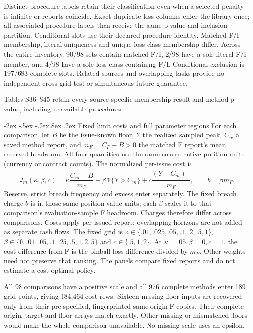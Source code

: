 \documentclass[10pt,a4paper]{article}
\makeatletter
\renewcommand\section{\@startsection{section}{1}{\z@}%
  {-2ex \@plus -.5ex \@minus -.2ex}{.8ex \@plus .2ex}%
  {\normalfont\large\bfseries}}
\makeatother
\begin{document}
Distinct procedure labels retain their classification even when a selected penalty is infinite or reports coincide. Exact duplicate loss columns enter the library once; all associated procedure labels then receive the same p-value and inclusion partition. Conditional slots use their declared procedure identity. Matched F/I membership, literal uniqueness and unique-loss-class membership differ. Across the entire inventory, 90/98 sets contain matched F/I, 2/98 have a sole literal F/I member, and 4/98 have a sole loss class containing F/I. Conditional exclusion is 197/683 complete slots. Related sources and overlapping tasks provide no independent cross-grid test or simultaneous future guarantee.

Tables S36--S45 retain every source-specific membership result and method p-value, including unavailable procedures.


\section{Fixed limit costs and full parameter regions}\label{sup:v10-cost}
For each comparison, let $B$ be the issue-known floor, $Y$ the realized sampled peak,
$C_m$ a saved method report, and $m_F=\overline{C_F-B}>0$ the matched F report's
mean reserved headroom. All four quantities use the same source-native position
units (currency or contract counts). The normalized per-issue cost is
\[
J_m(\kappa,\beta,c)=\kappa\frac{\overline{C_m-B}}{m_F}
+\beta\,\overline{\mathbf 1\{Y>C_m\}}
+c\frac{\overline{(Y-C_m)_+}}{m_F},\qquad b=\beta m_F.
\]
Reserve, strict breach frequency and excess enter separately. The fixed breach
charge $b$ is in those same position-value units; each $\beta$ scales it to that
comparison's evaluation-sample F headroom. Charges therefore differ across
comparisons. Costs apply per issued report; overlapping horizons are not
added as separate cash flows.
The fixed grid is $\kappa\in\{.01,.025,.05,.1,.2,.5,1\}$,
$\beta\in\{0,.01,.05,.1,.25,.5,1,2,5\}$ and $c\in\{.5,1,2\}$.
At $\kappa=.05,\beta=0,c=1$, the cost difference from F is the pinball-loss
difference divided by $m_F$. Other weights need not preserve that ranking.
The panels compare fixed reports and do not estimate a cost-optimal policy.

All 98 comparisons have a positive scale and all 976 complete methods enter 189 grid points, giving 184,464 cost rows. Sixteen missing-floor inputs are recovered only from their pre-specified, fingerprinted same-origin F copies. Their complete origin, target and floor arrays match exactly. Other missing or mismatched floors would make the whole comparison unavailable. No missing scale uses an epsilon.
\end{document}
